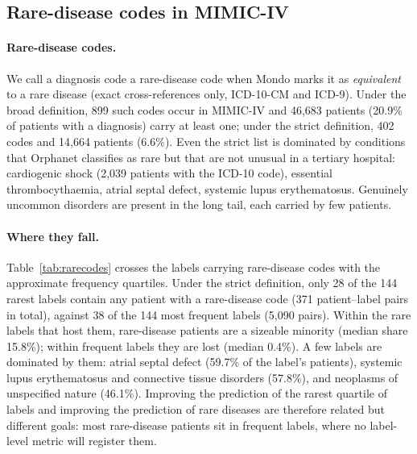 \documentclass[11pt]{article}
\begin{document}
\subsection{Rare-disease codes in MIMIC-IV}

\paragraph{Rare-disease codes.} We call a diagnosis code a rare-disease code when Mondo marks it as
\emph{equivalent} to a rare disease (exact cross-references only, ICD-10-CM and ICD-9). Under the broad
definition, 899 such codes occur in MIMIC-IV and 46,683 patients (20.9\% of patients with a diagnosis) carry at
least one; under the strict definition, 402 codes and 14,664 patients (6.6\%). Even the strict list is dominated
by conditions that Orphanet classifies as rare but that are not unusual in a tertiary hospital: cardiogenic
shock (2,039 patients with the ICD-10 code), essential thrombocythaemia, atrial septal defect, systemic lupus erythematosus. Genuinely
uncommon disorders are present in the long tail, each carried by few patients.

\paragraph{Where they fall.} Table~\ref{tab:rarecodes} crosses the labels carrying rare-disease codes with the
approximate frequency quartiles. Under the strict definition, only 28 of the 144 rarest labels contain any patient
with a rare-disease code (371 patient--label pairs in total), against 38 of the 144 most frequent labels (5,090
pairs). Within the rare labels that host them, rare-disease patients are a sizeable minority (median share 15.8\%);
within frequent labels they are lost (median 0.4\%). A few labels are dominated by them: atrial septal defect
(59.7\% of the label's patients), systemic lupus erythematosus and connective tissue disorders (57.8\%), and
neoplasms of unspecified nature (46.1\%). Improving the prediction of the rarest quartile of labels and improving
the prediction of rare diseases are therefore related but different goals: most rare-disease patients sit in
frequent labels, where no label-level metric will register them.
\end{document}
